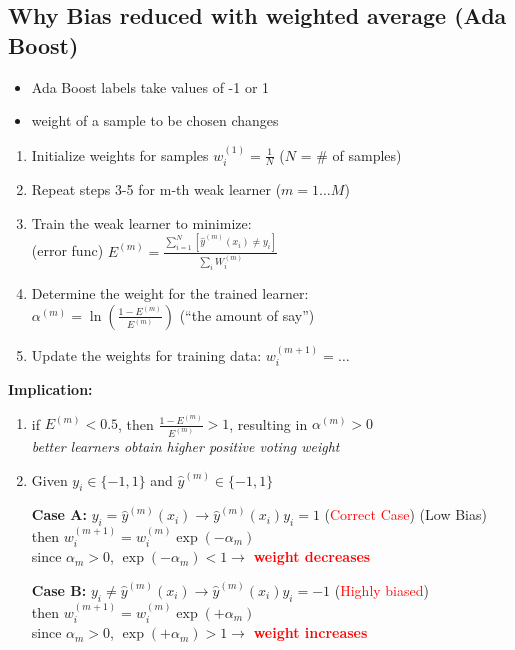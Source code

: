 \documentclass{article}
\begin{document}
\subsection*{Why Bias reduced with weighted average (Ada Boost)}
\begin{itemize}
    \item Ada Boost labels take values of -1 or 1
    \item weight of a sample to be chosen changes
\end{itemize}

\begin{enumerate}
    \item Initialize weights for samples $w_i^{(1)} = \frac{1}{N}$ ($N$ = \# of samples)
    \item Repeat steps 3-5 for m-th weak learner ($m = 1 \dots M$)
    \item Train the weak learner to minimize: \\
    (error func) $E^{(m)} = \frac{\sum_{i=1}^{N} [\hat{y}^{(m)}(x_i) \ne y_i]}{\sum_{i} W_i^{(m)}}$
    \item Determine the weight for the trained learner: \\
    $\alpha^{(m)} = \ln \left( \frac{1 - E^{(m)}}{E^{(m)}} \right)$ (``the amount of say'')
    \item Update the weights for training data: $w_i^{(m+1)} = \dots$
\end{enumerate}

\textbf{Implication:}
\begin{enumerate}
    \item if $E^{(m)} < 0.5$, then $\frac{1 - E^{(m)}}{E^{(m)}} > 1$, resulting in $\alpha^{(m)} > 0$ \\
    \textit{better learners obtain higher positive voting weight}
    \item Given $y_i \in \{-1, 1\}$ and $\hat{y}^{(m)} \in \{-1, 1\}$

    \textbf{Case A:} $y_i = \hat{y}^{(m)}(x_i) \rightarrow \hat{y}^{(m)}(x_i)y_i = 1$ (\textcolor{red}{Correct Case}) (Low Bias) \\
    then $w_i^{(m+1)} = w_i^{(m)} \exp(-\alpha_m)$ \\
    since $\alpha_m > 0$, $\exp(-\alpha_m) < 1 \rightarrow$ \textbf{\textcolor{red}{weight decreases}}

    \textbf{Case B:} $y_i \ne \hat{y}^{(m)}(x_i) \rightarrow \hat{y}^{(m)}(x_i)y_i = -1$ (\textcolor{red}{Highly biased}) \\
    then $w_i^{(m+1)} = w_i^{(m)} \exp(+\alpha_m)$ \\
    since $\alpha_m > 0$, $\exp(+\alpha_m) > 1 \rightarrow$ \textbf{\textcolor{red}{weight increases}}
\end{enumerate}
\end{document}
